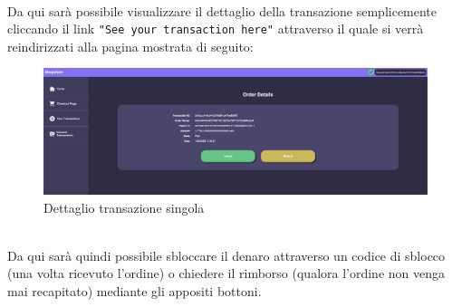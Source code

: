             \textbf{}\\
            Da qui sarà possibile visualizzare il dettaglio della transazione semplicemente cliccando il link \texttt{"See your transaction here"} attraverso il quale si verrà reindirizzati alla pagina mostrata di seguito:
            \begin{figure}[H]
                \centering
                \includegraphics[scale=0.2]{immagini/Checkout/SinglePaymentDetails.png}
                \caption{Dettaglio transazione singola}
            \end{figure}
            \textbf{}\\
            Da qui sarà quindi possibile sbloccare il denaro attraverso un codice di sblocco (una volta ricevuto l'ordine) o chiedere il rimborso (qualora l'ordine non venga mai recapitato) mediante gli appositi bottoni.
